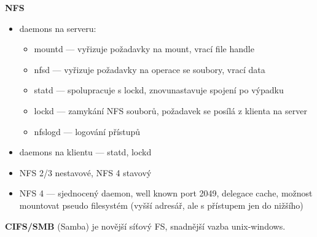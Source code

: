 \textbf{NFS}
\begin{itemize}
    \item daemons na serveru:
    \begin{itemize}
        \item mountd --- vyřizuje požadavky na mount, vrací file handle
        \item nfsd --- vyřizuje požadavky na operace se soubory, vrací data
        \item statd --- spolupracuje s lockd, znovunastavuje spojení po výpadku
        \item lockd --- zamykání NFS souborů, požadavek se posílá z klienta na server
        \item nfslogd --- logování přístupů
    \end{itemize}
    \item daemons na klientu --- statd, lockd
    \item NFS 2/3 nestavové, NFS 4 stavový
    \item NFS 4 --- sjednocený daemon, well known port 2049, delegace cache, možnost mountovat pseudo filesystém (vyšší adresář, ale s přístupem jen do nižšího)
\end{itemize}

\textbf{CIFS/SMB} (Samba) je novější síťový FS, snadnější vazba unix-windows.